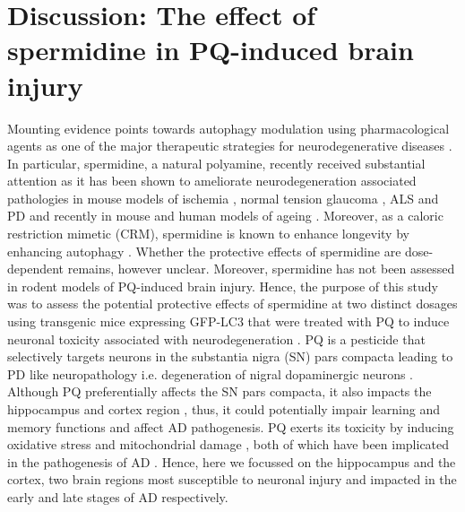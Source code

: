 \section{Discussion: The effect of spermidine in PQ-induced brain injury}
Mounting evidence points towards autophagy modulation using pharmacological agents as one of the major therapeutic strategies for neurodegenerative diseases \citep{Hebron2013,Jiang2014a,Perera2018,Ravikumar2004,Rose2010}. In particular, spermidine, a natural polyamine, recently received substantial attention as it has been shown to ameliorate neurodegeneration associated pathologies in mouse models of ischemia \citep{Morrison2002}, normal tension glaucoma \citep{Noro2015}, ALS \citep{Wang2012} and  PD \citep{Buttner2014} and recently in mouse and human models of ageing \citep{Schwarz2018,Wirth2019,Wirth2018}. Moreover, as a caloric restriction mimetic (CRM), spermidine is known to enhance longevity by enhancing autophagy \citep{Marino2014}. Whether the protective effects of spermidine are dose-dependent remains, however unclear. Moreover, spermidine has not been assessed in rodent models of PQ-induced brain injury. Hence, the purpose of this study was to assess the potential protective effects of spermidine at two distinct dosages using transgenic mice expressing GFP-LC3 \citep{Mizushima2004a} that were treated with PQ to induce neuronal toxicity associated with neurodegeneration \citep{Chen2012}. PQ is a pesticide that selectively targets neurons in the substantia nigra (SN) pars compacta leading to PD like neuropathology i.e. degeneration of nigral dopaminergic neurons \citep{McCormack2005, McCormack2002}. Although PQ preferentially affects the SN pars compacta, it also impacts the hippocampus and cortex region \citep{Landrigan2005}, thus, it could potentially impair learning and memory functions and affect AD pathogenesis. PQ exerts its toxicity by inducing oxidative stress and mitochondrial damage \citep{Baltazar2014,Drechsel2008,Lin2006}, both of which have been implicated in the pathogenesis of AD \citep{Lin2006}. Hence, here we focussed on the hippocampus and the cortex, two brain regions most susceptible to neuronal injury and impacted in the early and late stages of AD respectively.

